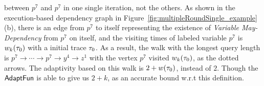 \begin{example}
    between $p^7$ and $p^7$ in one single iteration, 
    not the others. 
    As shown in the execution-based dependency graph in Figure~\ref{fig:multipleRoundSingle_example}(b), 
    there is an edge from $p^7$ to itself representing the existence of \emph{Variable May-Dependency} from $p^7$ on itself,
    and the visiting times of labeled variable $p^7$ is 
    $w_k(\mathtt{\tau}_0)$ with a initial trace $\mathtt{\tau}_0$. 
    As a result, the walk with the longest query length 
    is
    $p^7  \to \cdots \to p^7 \to y^4  \to z^1 $ with the vertex $p^7$ visited $w_k(\mathtt{\tau}_0)$,
    as the dotted arrows. 
    The adaptivity 
    based on
    this walk
    is $2 + w(\mathtt{\tau}_0)$, instead of $2$. 
    Though the $\textsf{AdaptFun}$ is able to give us $2 + k$,  as an accurate bound w.r.t this definition.
    

\end{example}
